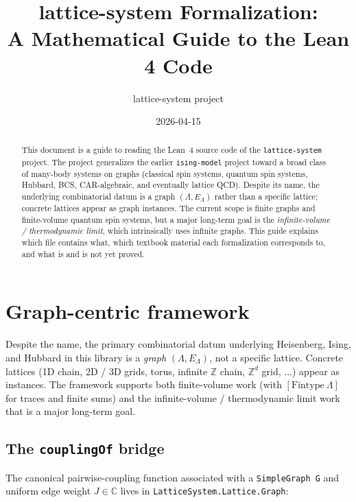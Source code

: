 \documentclass[a4paper,11pt]{article}
\title{lattice-system Formalization: \\
       A Mathematical Guide to the Lean 4 Code}
\author{lattice-system project}
\date{2026-04-15}
\begin{document}
\maketitle

\begin{abstract}
This document is a guide to reading the Lean~4 source code of the
\texttt{lattice-system} project. The project generalizes the earlier
\texttt{ising-model} project toward a broad class of many-body
systems on graphs (classical spin systems, quantum spin systems,
Hubbard, BCS, CAR-algebraic, and eventually lattice QCD). Despite
its name, the underlying combinatorial datum is a graph
$(\Lambda, E_\Lambda)$ rather than a specific lattice; concrete
lattices appear as graph instances. The current scope is finite
graphs and finite-volume quantum spin systems, but a major
long-term goal is the \emph{infinite-volume / thermodynamic limit},
which intrinsically uses infinite graphs. This guide explains which
file contains what, which textbook material each formalization
corresponds to, and what is and is not yet proved.
\end{abstract}

\tableofcontents

\section{Graph-centric framework}

Despite the name, the primary combinatorial datum underlying
Heisenberg, Ising, and Hubbard in this library is a
\emph{graph} $(\Lambda, E_\Lambda)$, not a specific lattice.
Concrete lattices (1D chain, 2D / 3D grids, torus, infinite
$\mathbb{Z}$ chain, $\mathbb{Z}^d$ grid, $\ldots$) appear as
instances. The framework supports both finite-volume work
(with $[\mathrm{Fintype}~\Lambda]$ for traces and finite sums)
and the infinite-volume / thermodynamic limit work that is a
major long-term goal.

\subsection{The \texttt{couplingOf} bridge}

The canonical pairwise-coupling function associated with a
\texttt{SimpleGraph G} and uniform edge weight $J \in \mathbb{C}$
lives in \texttt{LatticeSystem.Lattice.Graph}:
\end{document}
